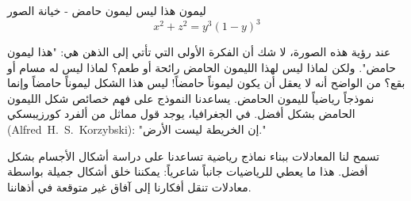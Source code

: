 \begin{surferPage}[ليمون]{ليمون }
هذا ليس ليمون حامض - خيانة الصور\\
\smallskip
\[x^2 + z^2 = y^3 (1 - y)^3\]


\singlespacing
عند رؤية هذه الصورة، لا شك أن الفكرة الأولى التي تأتي إلى الذهن هي: "هذا ليمون حامض". ولكن لماذا ليس لهذا الليمون الحامض رائحة أو طعم؟ لماذا ليس له مسام أو بقع؟ من الواضح أنه لا يعقل أن يكون ليموناً حامضاً!
\singlespacing
ليس هذا الشكل ليموناً حامضاً وإنما نموذجاً رياضياً لليمون الحامض. يساعدنا النموذج على فهم خصائص شكل الليمون الحامض بشكل أفضل. في الجغرافيا، يوجد قول مماثل من ألفرد كورزيبسكي
\textenglish{\mbox{(Alfred\ H.\ S.\ Korzybski)}}: 
 "إن الخريطة ليست الأرض." \\
\singlespacing

تسمح لنا المعادلات ببناء نماذج رياضية تساعدنا على دراسة أشكال الأجسام بشكل أفضل.
\singlespacing
هذا ما يعطي للرياضيات جانباً شاعرياً: يمكننا خلق أشكال جميلة بواسطة معادلات تنقل أفكارنا إلى آفاق غير متوقعة في أذهاننا.
\end{surferPage}
